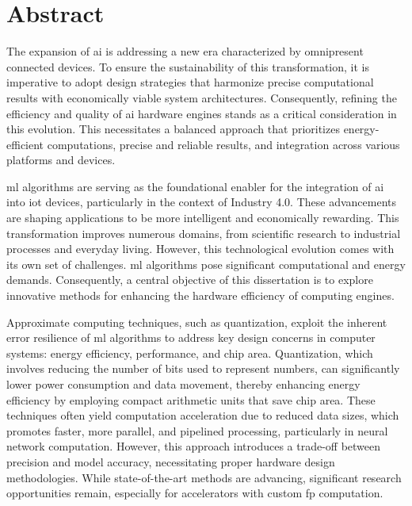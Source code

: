 \chapter*{Abstract}
\thispagestyle{empty}

The expansion of \gls{ai} is addressing a new era characterized by omnipresent connected devices. To ensure the sustainability of this transformation, it is imperative to adopt design strategies that harmonize precise computational results with economically viable system architectures. Consequently, refining the efficiency and quality of \gls{ai} hardware engines stands as a critical consideration in this evolution. This necessitates a balanced approach that prioritizes energy-efficient computations, precise and reliable results, and integration across various platforms and devices.

\gls{ml} algorithms are serving as the foundational enabler for the integration of \gls{ai} into \gls{iot} devices, particularly in the context of Industry 4.0. These advancements are shaping applications to be more intelligent and economically rewarding. This transformation improves numerous domains, from scientific research to industrial processes and everyday living. However, this technological evolution comes with its own set of challenges. \gls{ml} algorithms pose significant computational and energy demands. Consequently, a central objective of this dissertation is to explore innovative methods for enhancing the hardware efficiency of computing engines.

Approximate computing techniques, such as quantization, exploit the inherent error resilience of \gls{ml} algorithms to address key design concerns in computer systems: energy efficiency, performance, and chip area. Quantization, which involves reducing the number of bits used to represent numbers, can significantly lower power consumption and data movement, thereby enhancing energy efficiency by employing compact arithmetic units that save chip area. These techniques often yield computation acceleration due to reduced data sizes, which promotes faster, more parallel, and pipelined processing, particularly in neural network computation. However, this approach introduces a trade-off between precision and model accuracy, necessitating proper hardware design methodologies. While state-of-the-art methods are advancing, significant research opportunities remain, especially for accelerators with custom \gls{fp} computation.

